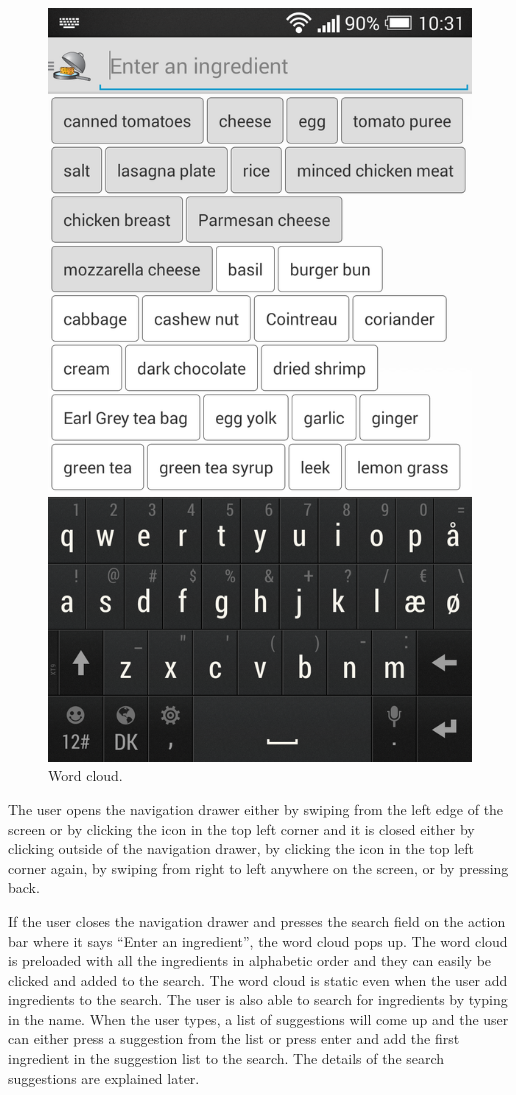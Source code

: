 \begin{figure}[H]
\begin{minipage}[t]{0.5\columnwidth}
\includegraphics[width=0.7\columnwidth]{img/screenshots/finalwordcloud.png}
\caption{Word cloud\label{fig:wordcloud}.}
\end{minipage}
\end{figure}

The user opens the navigation drawer either by swiping from the left edge of the screen or by clicking the icon in the top left corner and it is closed either by clicking outside of the navigation drawer, by clicking the icon in the top left corner again, by swiping from right to left anywhere on the screen, or by pressing back.

If the user closes the navigation drawer and presses the search field on the action bar where it says ``Enter an ingredient'', the word cloud pops up. The word cloud is preloaded with all the ingredients in alphabetic order and they can easily be clicked and added to the search. 
The word cloud is static even when the user add ingredients to the search. 
The user is also able to search for ingredients by typing in the name. 
When the user types, a list of suggestions will come up and the user can either press a suggestion from the list or press enter and add the first ingredient in the suggestion list to the search. 
The details of the search suggestions are explained later.


